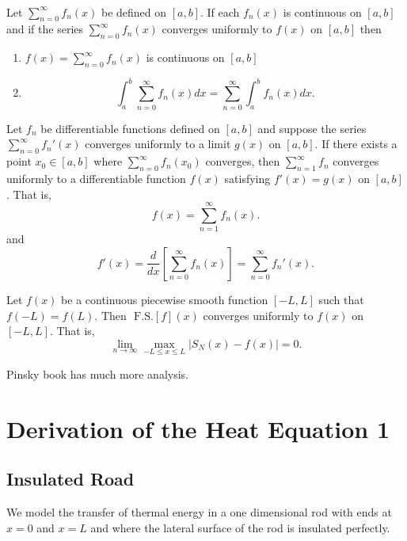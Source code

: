 \documentclass[class=article,crop=false]{standalone}
\begin{document}
~\begin{thm}
	Let $ \sum_{ n= 0}^{\infty} f_n(x)$ be defined on $ [a,b]$. If each  $ f_n(x)$ is continuous on $ [a,b]$ and if the series  $ \sum_{ n= 0}^{\infty} f_n(x)$ converges uniformly to $ f(x)$ on  $ [a,b]$ then
	 \begin{enumerate}[label=(\roman*)]
		 \item $ f(x) = \sum_{ n= 0}^{\infty} f_n(x)$ is continuous on $ [a,b]$ 
		 \item
			 \[
				 \int_{ a}^{ b} \sum_{ n= 0}^{\infty} f_n(x) dx = \sum_{ n= 0}^{\infty} \int_{ a}^{ b} f_n(x) dx  
			 .\] 
	\end{enumerate}
\end{thm}
\begin{thm}
	Let $ f_n$ be differentiable functions defined on $ [a,b]$ and suppose the series  $ \sum_{ n= 0}^{\infty} f_n'(x)$ converges uniformly to a limit $ g(x)$ on $ [a,b]$. If there exists a point $ x_0 \in [a,b]$ where $ \sum_{ n= 0}^{\infty} f_n(x_0)$ converges, then $ \sum_{ n= 1}^{\infty} f_n$ converges uniformly to a differentiable function $ f(x)$ satisfying  $ f'(x)=g(x)$ on  $ [a,b]$. That is,
	\[
		f(x) = \sum_{ n= 1}^{\infty} f_n(x)
	.\] 
	and
	 \[
		 f'(x) = \frac{d}{dx} \left[ \sum_{ n= 0}^{\infty} f_n(x) \right] = \sum_{ n= 0}^{\infty} f_n'(x)
	.\] 
\end{thm}

\begin{thm}
	Let $ f(x)$ be a continuous piecewise smooth function  $ [-L,L]$ such that  $ f(-L)=f(L)$. Then  $ \text{ F.S.} [ f]( x) $ converges uniformly to $ f(x)$ on  $ [-L,L]$. That is,
	 \[
		 \lim_{ n \to \infty} \max_{-L\leq x \leq L} |S_N(x) -f(x)| =0
	.\] 
\end{thm}

Pinsky book has much more analysis.

\newpage
\section{Derivation of the Heat Equation 1}
\subsection{Insulated Road}
We model the transfer of thermal energy in a one dimensional rod with ends at $ x=0$ and  $ x=L$ and where the lateral surface of the rod is insulated perfectly. 
\end{document}
